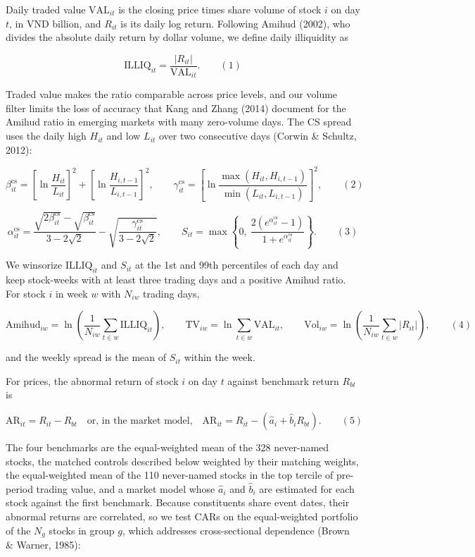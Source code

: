 \documentclass[review,authoryear,12pt]{elsarticle}
\begin{document}
Daily traded value \(\mathrm{VAL}_{it}\) is the closing price times
share volume of stock \(i\) on day \(t\), in VND billion, and \(R_{it}\)
is its daily log return. Following Amihud (2002), who divides the
absolute daily return by dollar volume, we define daily illiquidity as

\[\mathrm{ILLIQ}_{it} = \frac{|R_{it}|}{\mathrm{VAL}_{it}}. \qquad (1)\]

Traded value makes the ratio comparable across price levels, and our
volume filter limits the loss of accuracy that Kang and Zhang (2014)
document for the Amihud ratio in emerging markets with many zero-volume
days. The CS spread uses the daily high \(H_{it}\) and low \(L_{it}\)
over two consecutive days (Corwin \& Schultz, 2012):

\[\beta^{\mathrm{cs}}_{it} = \left[\ln\frac{H_{it}}{L_{it}}\right]^2 + \left[\ln\frac{H_{i,t-1}}{L_{i,t-1}}\right]^2, \qquad \gamma^{\mathrm{cs}}_{it} = \left[\ln\frac{\max(H_{it}, H_{i,t-1})}{\min(L_{it}, L_{i,t-1})}\right]^2, \qquad (2)\]

\[\alpha^{\mathrm{cs}}_{it} = \frac{\sqrt{2\beta^{\mathrm{cs}}_{it}} - \sqrt{\beta^{\mathrm{cs}}_{it}}}{3 - 2\sqrt{2}} - \sqrt{\frac{\gamma^{\mathrm{cs}}_{it}}{3 - 2\sqrt{2}}}, \qquad S_{it} = \max\left\{0,\ \frac{2\left(e^{\alpha^{\mathrm{cs}}_{it}} - 1\right)}{1 + e^{\alpha^{\mathrm{cs}}_{it}}}\right\}. \qquad (3)\]

We winsorize \(\mathrm{ILLIQ}_{it}\) and \(S_{it}\) at the 1st and 99th
percentiles of each day and keep stock-weeks with at least three trading
days and a positive Amihud ratio. For stock \(i\) in week \(w\) with
\(N_{iw}\) trading days,

\[\mathrm{Amihud}_{iw} = \ln\left(\frac{1}{N_{iw}}\sum_{t \in w}\mathrm{ILLIQ}_{it}\right), \qquad \mathrm{TV}_{iw} = \ln\sum_{t \in w}\mathrm{VAL}_{it}, \qquad \mathrm{Vol}_{iw} = \ln\left(\frac{1}{N_{iw}}\sum_{t \in w}|R_{it}|\right), \qquad (4)\]

and the weekly spread is the mean of \(S_{it}\) within the week.

For prices, the abnormal return of stock \(i\) on day \(t\) against
benchmark return \(R_{bt}\) is

\[\mathrm{AR}_{it} = R_{it} - R_{bt} \quad \text{or, in the market model,} \quad \mathrm{AR}_{it} = R_{it} - \left(\hat a_i + \hat b_i R_{bt}\right). \qquad (5)\]

The four benchmarks are the equal-weighted mean of the 328 never-named
stocks, the matched controls described below weighted by their matching
weights, the equal-weighted mean of the 110 never-named stocks in the
top tercile of pre-period trading value, and a market model whose
\(\hat a_i\) and \(\hat b_i\) are estimated for each stock against the
first benchmark. Because constituents share event dates, their abnormal
returns are correlated, so we test CARs on the equal-weighted portfolio
of the \(N_g\) stocks in group \(g\), which addresses cross-sectional
dependence (Brown \& Warner, 1985):
\end{document}
